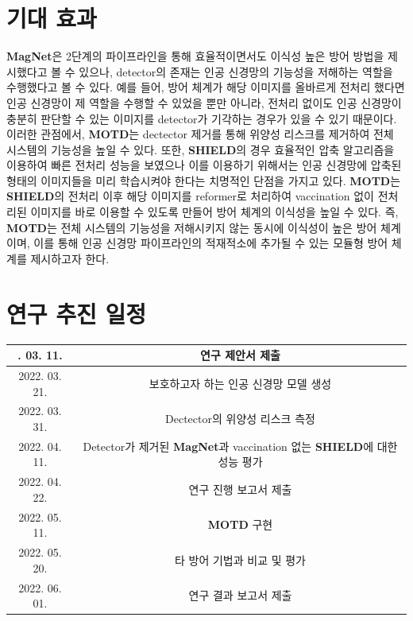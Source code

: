 \documentclass{article}
\begin{document}
\section{기대 효과}

\textbf{MagNet}은 2단계의 파이프라인을 통해 효율적이면서도 이식성 높은 방어 방법을 제시했다고 볼 수 있으나, detector의 존재는 인공 신경망의 기능성을 저해하는 역할을 수행했다고 볼 수 있다. 예를 들어, 방어 체계가 해당 이미지를 올바르게 전처리 했다면 인공 신경망이 제 역할을 수행할 수 있었을 뿐만 아니라, 전처리 없이도 인공 신경망이 충분히 판단할 수 있는 이미지를 detector가 기각하는 경우가 있을 수 있기 때문이다. 이러한 관점에서, \textbf{MOTD}는 dectector 제거를 통해 위양성 리스크를 제거하여 전체 시스템의 기능성을 높일 수 있다. 또한, \textbf{SHIELD}의 경우 효율적인 압축 알고리즘을 이용하여 빠른 전처리 성능을 보였으나 이를 이용하기 위해서는 인공 신경망에 압축된 형태의 이미지들을 미리 학습시켜야 한다는 치명적인 단점을 가지고 있다. \textbf{MOTD}는 \textbf{SHIELD}의 전처리 이후 해당 이미지를 reformer로 처리하여 vaccination 없이 전처리된 이미지를 바로 이용할 수 있도록 만들어 방어 체계의 이식성을 높일 수 있다. 즉, \textbf{MOTD}는 전체 시스템의 기능성을 저해시키지 않는 동시에 이식성이 높은 방어 체계이며, 이를 통해 인공 신경망 파이프라인의 적재적소에 추가될 수 있는 모듈형 방어 체계를 제시하고자 한다. 


\section{연구 추진 일정}

\begin{table}[h]
    \centering
    \label{t2}
    \begin{tabular}{c|c}
        \noalign{\smallskip}\noalign{\smallskip}\hline
        2022. 03. 11. & 연구 제안서 제출  \\
        \hline
        2022. 03. 21. & 보호하고자 하는 인공 신경망 모델 생성 \\
        \hline
        2022. 03. 31. & Dectector의 위양성 리스크 측정 \\
        \hline
        2022. 04. 11. & Detector가 제거된 \textbf{MagNet}과 vaccination 없는 \textbf{SHIELD}에 대한 성능 평가 \\
        \hline
        2022. 04. 22. & 연구 진행 보고서 제출  \\
        \hline
        2022. 05. 11. & \textbf{MOTD} 구현 \\
        \hline
        2022. 05. 20. & 타 방어 기법과 비교 및 평가 \\
        \hline
        2022. 06. 01. & 연구 결과 보고서 제출  \\
        \hline
    \end{tabular}
\end{table}



\end{document}
